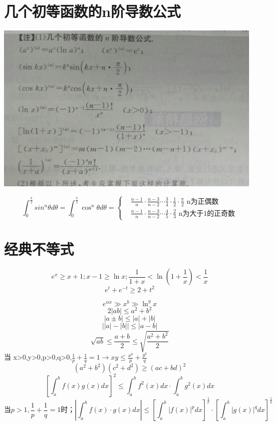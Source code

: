 \documentclass[UTF8]{ctexart}
\begin{document}
\section{几个初等函数的n阶导数公式}
\includegraphics[width=13cm]{9345E7/2A793F093B002F668B144F9ED087EB77.jpg}


$$ \int_0^\frac{\pi}{2} sin^n θ d \theta =\int_0^\frac{\pi}{2} \cos^n \theta d \theta =
\begin{cases}
  &\frac{n-1}{n}\cdot\frac{n-3}{n-2} \cdots \frac{3}{4}\cdot\frac{1}{2}\cdot\frac{\pi}{2}\mbox{  n为正偶数} \\
  &\frac{n-1}{n}\cdot\frac{n-3}{n-2}\cdots\frac{4}{5}\cdot\frac{2}{3}\mbox{  n为大于1的正奇数}
\end{cases}
$$

\section{经典不等式}
$$e^x \geq x+1 ; x-1 \geq \ln x ; \frac{1}{1+x} < \ln \left( 1+ \frac{1}{x} \right) < \frac{1}{x}$$
$$ e^t + e^{-t} \geq 2+t^2 $$

$$ e^{αx} \gg x^b \gg \ln^y x $$
$$ 2\left| ab \right| \leq a^2+b^2$$
$$ \left| a \pm b \right| \leq |a|+|b|$$
$$ \left| |a| - |b| \right| \leq |a-b|$$
$$\sqrt{ab} \leq \frac{a+b}{2} \leq \sqrt{\frac{a^2+b^2}{2}}$$
当 x>0,y>0,p>0,q>0,$\frac{1}{p}+\frac{1}{q}=1 \rightarrow xy \leq \frac{x^p}{p}+\frac{y^q}{q}$
$$(a^2+b^2)(c^2+d^2) \geq (ac+bd)^2$$
$$ [\int_a^b f(x)g(x)dx]^2 \leq \int_a^b f^2(x)dx\cdot \int_a^b g^2(x)dx$$
$$\mbox{当} p>1, \frac{1}{p}+\frac{1}{q}=1 \mbox{时；} \left| \int_a^b f(x) \cdot g(x)dx\right| \leq \left[ \int_a^b \left| f(x) \right|^p dx \right] ^\frac{1}{p} \cdot \left[ \int_a^b \left| g(x) \right|^q dx \right] ^\frac{1}{q}$$
\end{document}
